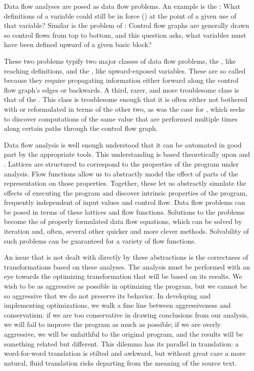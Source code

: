 Data flow analyses are posed as data flow problems. An example is the : What definitions of a variable could still be in force () at the point of a given use of that variable? Similar is the problem of : Control flow graphs are generally drawn so control flows from top to bottom, and this question asks, what variables must have been defined upward of a given basic block?

These two problems typify two major classes of data flow problems, the , like reaching definitions, and the , like upward-exposed variables. These are so called because they require propagating information either forward along the control flow graph's edges or backwards. A third, rarer, and more troublesome class is that of the . This class is troublesome enough that it is often either not bothered with or reformulated in terms of the other two, as was the case for , which seeks to discover computations of the same value that are performed multiple times along certain paths through the control flow graph.

Data flow analysis is well enough understood that it can be automated in good part by the appropriate tools. This understanding is based theoretically upon  and . Lattices are structured to correspond to the properties of the program under analysis. Flow functions allow us to abstractly model the effect of parts of the representation on those properties. Together, these let us abstractly simulate the effects of executing the program and discover intrinsic properties of the program, frequently independent of input values and control flow. Data flow problems can be posed in terms of these lattices and flow functions. Solutions to the problems become the  of properly formulated data flow equations, which can be solved by iteration and, often, several other quicker and more clever methods. Solvability of such problems can be guaranteed for a variety of flow functions.

An issue that is not dealt with directly by these abstractions is the correctness of transformations based on these analyses. The analysis must be performed with an eye towards the optimizing transformation that will be based on its results. We wish to be as aggressive as possible in optimizing the program, but we cannot be so aggressive that we do not preserve its behavior. In developing and implementing optimizations, we walk a fine line between aggressiveness and conservatism: if we are too conservative in drawing conclusions from our analysis, we will fail to improve the program as much as possible; if we are overly aggressive, we will be unfaithful to the original program, and the results will be something related but different. This dilemma has its parallel in translation: a word-for-word translation is stilted and awkward, but without great care a more natural, fluid translation risks departing from the meaning of the source text.

